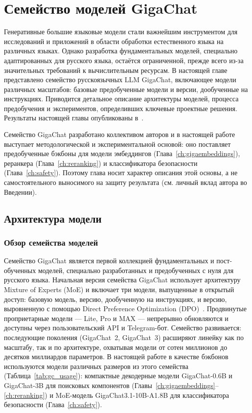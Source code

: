 \chapter{Семейство моделей GigaChat}\label{ch:gigachat}

Генеративные большие языковые модели стали важнейшим инструментом для исследований и приложений в области обработки естественного языка на различных языках. Однако разработка фундаментальных моделей, специально адаптированных для русского языка, остаётся ограниченной, прежде всего из-за значительных требований к вычислительным ресурсам. В настоящей главе представлено семейство русскоязычных LLM GigaChat, включающее модели различных масштабов: базовые предобученные модели и версии, дообученные на инструкциях. Приводится детальное описание архитектуры моделей, процесса предобучения и экспериментов, определивших ключевые проектные решения. Результаты настоящей главы опубликованы в~\cite{2506.09440}.

Семейство GigaChat разработано коллективом авторов и в настоящей работе выступает методологической и экспериментальной основой: оно поставляет предобученные бэкбоны для модели эмбеддингов (Глава~\ref{ch:gigaembeddings}), реранкера (Глава~\ref{ch:reranking}) и классификатора безопасности (Глава~\ref{ch:safety}). Поэтому глава носит характер описания этой основы, а не самостоятельного выносимого на защиту результата (см. личный вклад автора во Введении).

\section{Архитектура модели}\label{sec:gc_architecture}

\subsection{Обзор семейства моделей}\label{subsec:gc_overview}

Семейство GigaChat является первой коллекцией фундаментальных и пост-обученных моделей, специально разработанных и предобученных с нуля для русского языка. Начальная версия семейства GigaChat использует архитектуру Mixture of Experts (MoE) и включает три модели, выпущенные в открытый доступ: базовую модель, версию, дообученную на инструкциях, и версию, выровненную с помощью Direct Preference Optimization (DPO)~\cite{rafailov2023dpo}. Продвинутые проприетарные модели --- Lite, Pro и MAX --- непрерывно обновляются и доступны через пользовательский API и Telegram-бот.
Семейство развивается: последующие поколения (GigaChat~2, GigaChat~3) расширяют линейку как по масштабу, так и по архитектуре, охватывая модели от сотен миллионов до десятков миллиардов параметров.
В настоящей работе в качестве бэкбонов используются модели различных размеров из этого семейства (Таблица~\ref{tab:gc_usage}): компактные декодерные модели GigaChat-0.6B и GigaChat-3B для поисковых компонентов (Главы~\ref{ch:gigaembeddings}--\ref{ch:reranking}) и MoE-модель GigaChat3.1-10B-A1.8B для классификатора безопасности (Глава~\ref{ch:safety}).


